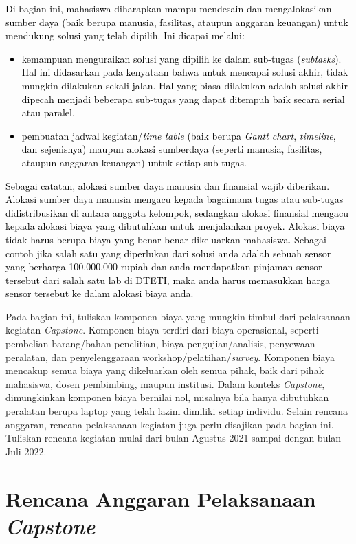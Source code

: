 \textcolor{black}{Di bagian ini, mahasiswa diharapkan mampu mendesain dan mengalokasikan sumber daya (baik berupa manusia, fasilitas, ataupun anggaran keuangan) untuk mendukung solusi yang telah dipilih. Ini dicapai melalui:
\begin{itemize}
    \item kemampuan menguraikan solusi yang dipilih ke dalam sub-tugas (\textit{subtasks}). Hal ini didasarkan pada kenyataan bahwa untuk mencapai solusi akhir, tidak mungkin dilakukan sekali jalan. Hal yang biasa dilakukan adalah solusi akhir dipecah menjadi  beberapa sub-tugas yang dapat ditempuh baik secara serial atau paralel.
    \item pembuatan jadwal kegiatan/\textit{time table} (baik berupa \textit{Gantt chart}, \textit{timeline}, dan sejenisnya) maupun alokasi sumberdaya (seperti manusia, fasilitas, ataupun anggaran keuangan) untuk setiap sub-tugas.
\end{itemize}
Sebagai catatan, alokasi\underline{ sumber daya  manusia dan finansial wajib diberikan}. Alokasi sumber daya manusia mengacu kepada bagaimana tugas atau sub-tugas didistribusikan di antara anggota kelompok, sedangkan alokasi finansial mengacu kepada alokasi biaya yang dibutuhkan untuk menjalankan proyek. Alokasi biaya tidak harus berupa biaya yang benar-benar dikeluarkan mahasiswa. Sebagai contoh jika salah satu yang diperlukan dari solusi anda adalah sebuah sensor yang berharga 100.000.000 rupiah dan anda mendapatkan pinjaman sensor tersebut dari salah satu lab di DTETI, maka anda harus memasukkan harga sensor tersebut ke dalam alokasi biaya anda.
}


Pada bagian ini, tuliskan komponen biaya yang mungkin timbul dari pelaksanaan kegiatan \textit{Capstone}. Komponen biaya terdiri dari biaya operasional, seperti pembelian barang/bahan penelitian, biaya pengujian/analisis, penyewaan peralatan, dan penyelenggaraan workshop/pelatihan/\textit{survey}. Komponen biaya mencakup semua biaya yang dikeluarkan oleh semua pihak, baik dari pihak mahasiswa, dosen pembimbing, maupun institusi. Dalam konteks \textit{Capstone}, dimungkinkan komponen biaya bernilai nol, misalnya bila hanya dibutuhkan peralatan berupa laptop yang telah lazim dimiliki setiap individu. Selain rencana anggaran, rencana pelaksanaan kegiatan juga perlu disajikan pada bagian ini. Tuliskan rencana kegiatan mulai dari bulan Agustus 2021 sampai dengan bulan Juli 2022.

\section{Rencana Anggaran Pelaksanaan \textit{Capstone}}

